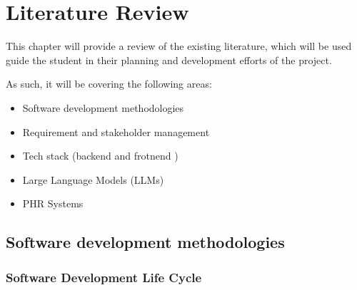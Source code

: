 \chapter{Literature Review}

This chapter will provide a review of the existing literature, which will be used guide the student in their planning and development efforts of the project.

\noindent As such, it will be covering the following areas:
\begin{itemize}
    \item Software development methodologies
    \item Requirement and stakeholder management
    \item Tech stack (backend and frotnend
    )
    \item Large Language Models (LLMs)
    \item PHR Systems
\end{itemize}

\section{Software development methodologies}
\subsection{Software Development Life Cycle}

